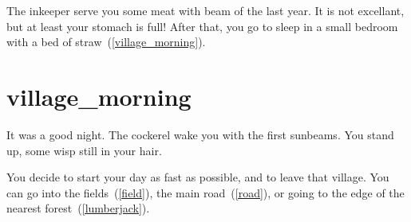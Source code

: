 The inkeeper serve you some meat with beam of the last year. It is not
excellant, but at least your stomach is full! After that, you go to sleep in a
small bedroom with a bed of straw~(\ref{village_morning}).

\section{village_morning}

It was a good night. The cockerel wake you with the first sunbeams. You stand
up, some wisp still in your hair.

You decide to start your day as fast as possible, and to leave that village.
You can go into the fields~(\ref{field}), the main road~(\ref{road}), or
going to the edge of the nearest forest~(\ref{lumberjack}).

